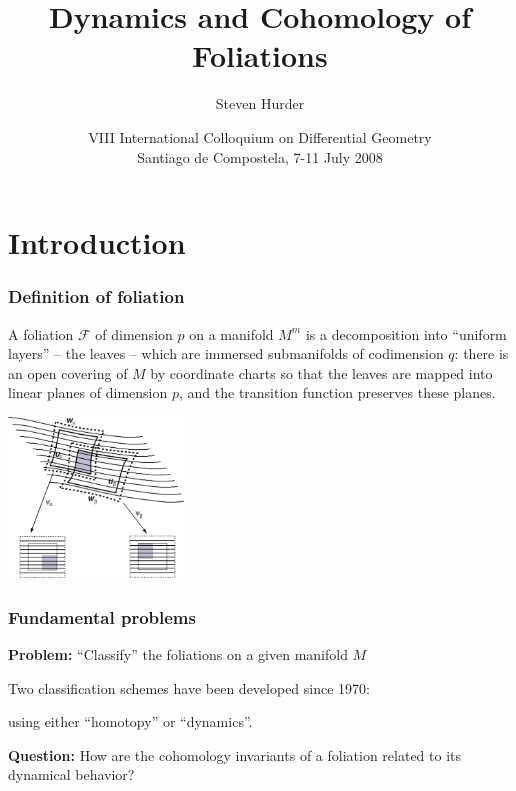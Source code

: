 \documentclass{beamer}
\date[July 7-11, 2008]
 {VIII International Colloquium on Differential Geometry \\
Santiago de Compostela, 7-11 July 2008}
\title[Cohomology of Foliations]{Dynamics and Cohomology of Foliations}
\author{Steven Hurder}
\institute[UIC] {University of Illinois at Chicago\\www.math.uic.edu/$\sim$hurder}
\begin{document}
\frame{\titlepage} %


\section{Introduction}
 
  
 
\frame %
{
  \frametitle{Definition of foliation}
 
  A foliation $\mathcal F$ of dimension $p$ on a manifold $M^m$ is a 
 decomposition  into ``uniform layers'' -- the leaves -- which are immersed submanifolds of codimension $q$:  there is an open covering of $M$ by   coordinate charts 
so that the leaves are mapped into linear planes of dimension $p$, and the transition function preserves these planes.
\begin{center}
\includegraphics[width=0.35\textwidth]{pix/chart.pdf}
\end{center}
 
 \vfill   

}


\frame %
{
  \frametitle{Fundamental problems}
 
  
 {\bf Problem:}      ``Classify'' the foliations on a given manifold $M$
  
  \bigskip
  \pause
Two classification schemes have been developed since 1970:

 using either ``homotopy'' or ``dynamics''.
 
\medskip

 {\bf Question:}   
How are the cohomology invariants of a foliation  related to its dynamical behavior?
 
    
\vfill

}
\end{document}
